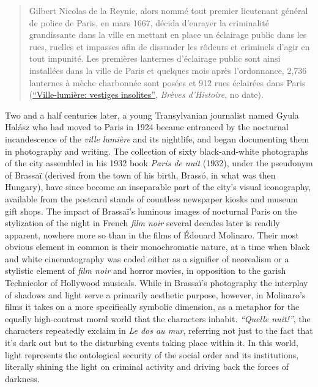 \documentclass[
  letterpaper,
  DIV=11,
  numbers=noendperiod,
  oneside]{scrartcl}
\begin{document}
\begin{quote}
Gilbert Nicolas de la Reynie, alors nommé tout premier lieutenant
général de police de Paris, en mars 1667, décida d'enrayer la
criminalité grandissante dans la ville en mettant en place un éclairage
public dans les rues, ruelles et impasses afin de dissuader les rôdeurs
et criminels d'agir en tout
impunité.{} Les
premières lanternes d'éclairage public sont ainsi installées dans la
ville de Paris et quelques mois après l'ordonnance, 2,736 lanternes à
mèche charbonnée sont posées et 912 rues éclairées dans Paris
(\href{https://breves-histoire.fr/thematique/ville-lumiere/}{``Ville-lumière:
vestiges insolites''}, \emph{Brèves d'Histoire}, no date).
\end{quote}

Two and a half centuries later, a young Transylvanian journalist named
Gyula Halász who had moved to Paris in 1924 became entranced by the
nocturnal incandescence of the \emph{ville lumière} and its nightlife,
and began documenting them in photography and writing. The collection of
sixty black-and-white photographs of the city assembled in his 1932 book
\emph{Paris de nuit} (1932), under the pseudonym of Brassaï (derived
from the town of his birth, Brassó, in what was then Hungary), have
since become an inseparable part of the city's visual iconography,
available from the postcard stands of countless newspaper kiosks and
museum gift shops. The impact of Brassaï's luminous images of nocturnal
Paris on the stylization of the night in French \emph{film noir} several
decades later is readily apparent, nowhere more so than in the films of
Édouard Molinaro. Their most obvious element in common is their
monochromatic nature, at a time when black and white cinematography was
coded either as a signifier of neorealism or a stylistic element of
\emph{film noir} and horror movies, in opposition to the garish
Technicolor of Hollywood musicals. While in Brassaï's photography the
interplay of shadows and light serve a primarily aesthetic purpose,
however, in Molinaro's films it takes on a more specifically symbolic
dimension, as a metaphor for the equally high-contrast moral world that
the characters inhabit. \emph{``Quelle nuit!''}, the characters
repeatedly exclaim in \emph{Le dos au mur}, referring not just to the
fact that it's dark out but to the disturbing events taking place within
it. In this world, light represents the ontological security of the
social order and its institutions, literally shining the light on
criminal activity and driving back the forces of darkness.
\end{document}
